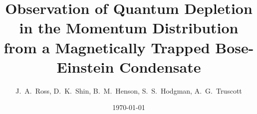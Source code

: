 \documentclass[%
	 aps,%
	 prl,%
	 a4paper,%
	 amsmath,amssymb,%
	 preprint,%
	 reprint,%
]{revtex4-1}
\begin{document}
\title{Observation of Quantum Depletion in the Momentum Distribution from a Magnetically Trapped Bose-Einstein Condensate}

\author{J.~A.~Ross, D.~K.~Shin, B.~M.~Henson, S.~S.~Hodgman, A.~G.~Truscott}


\date{\today}

\begin{abstract}

\end{abstract}

\maketitle
\end{document}
